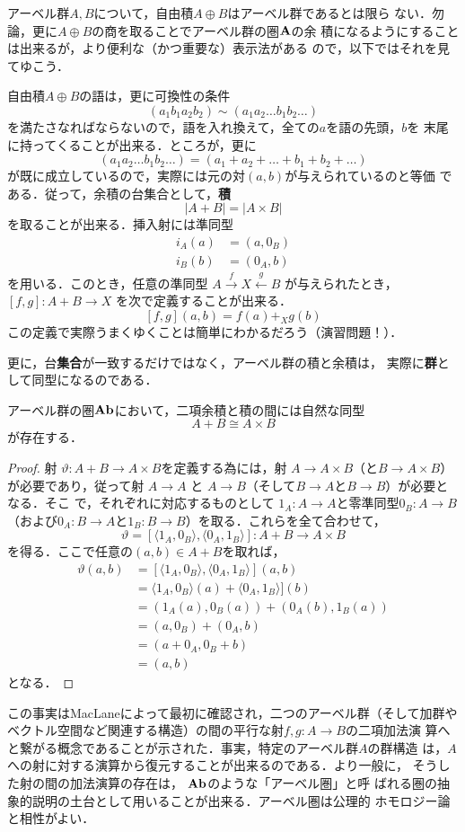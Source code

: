 \begin{example}
 アーベル群$A, B$について，自由積$A \oplus B$はアーベル群であるとは限ら
 ない．勿論，更に$A \oplus B$の商を取ることでアーベル群の圏${\bf A}$の余
 積になるようにすることは出来るが，より便利な（かつ重要な）表示法がある
 ので，以下ではそれを見てゆこう．

 自由積$A\oplus B$の語は，更に可換性の条件
 \[
  (a_1 b_1 a_2 b_2) \sim (a_1 a_2 \ldots b_1 b_2 \ldots)
 \]
 を満たさなればならないので，語を入れ換えて，全ての$a$を語の先頭，$b$を
 末尾に持ってくることが出来る．ところが，更に
 \[
  (a_1 a_2 \ldots b_1 b_2 \ldots)
    = (a_1 + a_2 + \ldots + b_1 + b_2 + \ldots)
 \]
 が既に成立しているので，実際には元の対$(a, b)$が与えられているのと等価
 である．従って，余積の台集合として，{\bfseries 積}
 \[
  |A+B| = |A\times B|
 \]
 を取ることが出来る．挿入射には準同型
 \begin{align*}
  i_A(a) &= (a, 0_B)\\
  i_B(b) &= (0_A, b)
 \end{align*}
 を用いる．このとき，任意の準同型 $A \xrightarrow{f} X \xleftarrow{g} B$
 が与えられたとき，$[f, g]: A+B \to X$ を次で定義することが出来る．
 \[
  [f, g](a, b) = f(a) +_X g(b)
 \]
 この定義で実際うまくゆくことは簡単にわかるだろう（演習問題！）．

 更に，台{\bfseries 集合}が一致するだけではなく，アーベル群の積と余積は，
 実際に{\bfseries 群}として同型になるのである．
 \begin{prop}
  アーベル群の圏${\bf Ab}$において，二項余積と積の間には自然な同型
  \[
   A + B \cong A \times B
  \]
  が存在する．
 \end{prop}
 \begin{proof}
  射 $\vartheta: A + B \to A \times B$を定義する為には，射
  $A \to A \times B$（と$B \to A \times B$）が必要であり，従って射
  $A \to A$ と $A \to B$（そして$B \to A$と$B \to B$）が必要となる．そこ
  で，それぞれに対応するものとして $1_A : A \to A$と零準同型$0_B:A\to B$
  （および$0_A: B \to A$と$1_B: B \to B$）を取る．これらを全て合わせて，
  \[
   \vartheta = [\langle 1_A, 0_B\rangle, \langle 0_A, 1_B\rangle]
             : A + B \to A \times B
  \]
  を得る．ここで任意の$(a,b) \in A+B$を取れば，
  \begin{align*}
   \vartheta(a,b)
   &= [\langle 1_A, 0_B\rangle, \langle 0_A, 1_B\rangle](a,b)\\
   &= \langle 1_A, 0_B\rangle(a) + \langle 0_A, 1_B\rangle](b)\\
   &= (1_A(a), 0_B(a)) + (0_A(b), 1_B(a))\\
   &= (a, 0_B) + (0_A, b)\\
   &= (a + 0_A, 0_B + b)\\
   &= (a, b)
  \end{align*}
  となる．
 \end{proof}
 この事実はMacLaneによって最初に確認され，二つのアーベル群（そして加群や
 ベクトル空間など関連する構造）の間の平行な射$f, g: A \to B$の二項加法演
 算へと繋がる概念であることが示された．事実，特定のアーベル群$A$の群構造
 は，$A$への射に対する演算から復元することが出来るのである．より一般に，
 そうした射の間の加法演算の存在は， ${\bf Ab}$のような「アーベル圏」と呼
 ばれる圏の抽象的説明の土台として用いることが出来る．アーベル圏は公理的
 ホモロジー論と相性がよい．


\end{example}

